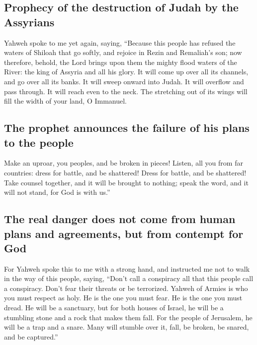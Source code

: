 \hypertarget{prophecy-of-the-destruction-of-judah-by-the-assyrians}{%
\subsection{Prophecy of the destruction of Judah by the
Assyrians}\label{prophecy-of-the-destruction-of-judah-by-the-assyrians}}

 Yahweh spoke to me yet again, saying, 
``Because this people has refused the waters of Shiloah that go softly,
and rejoice in Rezin and Remaliah's son;  now therefore,
behold, the Lord brings upon them the mighty flood waters of the River:
the king of Assyria and all his glory. It will come up over all its
channels, and go over all its banks.  It will sweep onward
into Judah. It will overflow and pass through. It will reach even to the
neck. The stretching out of its wings will fill the width of your land,
O Immanuel.

\hypertarget{the-prophet-announces-the-failure-of-his-plans-to-the-people}{%
\subsection{The prophet announces the failure of his plans to the
people}\label{the-prophet-announces-the-failure-of-his-plans-to-the-people}}

 Make an uproar, you peoples, and be broken in pieces!
Listen, all you from far countries: dress for battle, and be shattered!
Dress for battle, and be shattered!  Take counsel
together, and it will be brought to nothing; speak the word, and it will
not stand, for God is with us.''

\hypertarget{the-real-danger-does-not-come-from-human-plans-and-agreements-but-from-contempt-for-god}{%
\subsection{The real danger does not come from human plans and
agreements, but from contempt for
God}\label{the-real-danger-does-not-come-from-human-plans-and-agreements-but-from-contempt-for-god}}

 For Yahweh spoke this to me with a strong hand, and
instructed me not to walk in the way of this people, saying,
 ``Don't call a conspiracy all that this people call a
conspiracy. Don't fear their threats or be terrorized. 
Yahweh of Armies is who you must respect as holy. He is the one you must
fear. He is the one you must dread.  He will be a
sanctuary, but for both houses of Israel, he will be a stumbling stone
and a rock that makes them fall. For the people of Jerusalem, he will be
a trap and a snare.  Many will stumble over it, fall, be
broken, be snared, and be captured.''

